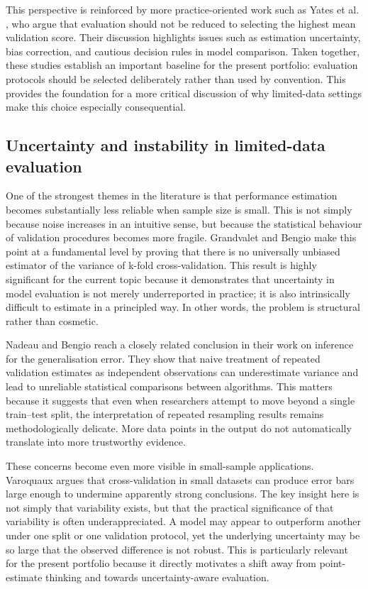 \documentclass[11pt,a4paper]{article}
\begin{document}
This perspective is reinforced by more practice-oriented work such as Yates et al. \cite{yates2022crossvalidation}, who argue that evaluation should not be reduced to selecting the highest mean validation score. Their discussion highlights issues such as estimation uncertainty, bias correction, and cautious decision rules in model comparison. Taken together, these studies establish an important baseline for the present portfolio: evaluation protocols should be selected deliberately rather than used by convention. This provides the foundation for a more critical discussion of why limited-data settings make this choice especially consequential.

\subsection{Uncertainty and instability in limited-data evaluation}

One of the strongest themes in the literature is that performance estimation becomes substantially less reliable when sample size is small. This is not simply because noise increases in an intuitive sense, but because the statistical behaviour of validation procedures becomes more fragile. Grandvalet and Bengio \cite{bengio2004nounbiased} make this point at a fundamental level by proving that there is no universally unbiased estimator of the variance of k-fold cross-validation. This result is highly significant for the current topic because it demonstrates that uncertainty in model evaluation is not merely underreported in practice; it is also intrinsically difficult to estimate in a principled way. In other words, the problem is structural rather than cosmetic.

Nadeau and Bengio \cite{nadeau2003inference} reach a closely related conclusion in their work on inference for the generalisation error. They show that naive treatment of repeated validation estimates as independent observations can underestimate variance and lead to unreliable statistical comparisons between algorithms. This matters because it suggests that even when researchers attempt to move beyond a single train--test split, the interpretation of repeated resampling results remains methodologically delicate. More data points in the output do not automatically translate into more trustworthy evidence.

These concerns become even more visible in small-sample applications. Varoquaux \cite{varoquaux2018crossvalidation} argues that cross-validation in small datasets can produce error bars large enough to undermine apparently strong conclusions. The key insight here is not simply that variability exists, but that the practical significance of that variability is often underappreciated. A model may appear to outperform another under one split or one validation protocol, yet the underlying uncertainty may be so large that the observed difference is not robust. This is particularly relevant for the present portfolio because it directly motivates a shift away from point-estimate thinking and towards uncertainty-aware evaluation.
\end{document}
